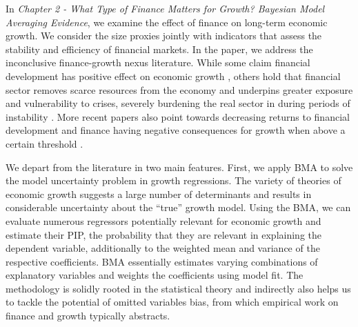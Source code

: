 \begin{refsection}
In \emph{Chapter 2 - What Type of Finance Matters for Growth? Bayesian Model Averaging Evidence}, we examine the effect of finance on long-term economic growth. We consider the size proxies jointly with indicators that assess the stability and efficiency of financial markets. In the paper, we address the inconclusive finance-growth nexus literature. While some claim financial development has positive effect on economic growth \parencite{AtjeJovanovich1993,KingLevine1993a,RajanZingales1998}, others hold that financial sector removes scarce resources from the economy \parencite{bolton2016cream,Tobin1984,axelson2015wall} and underpins greater exposure and vulnerability to crises, severely burdening the real sector in during periods of instability \parencite{Minsky1991,Stiglitz2000}. More recent papers also point towards decreasing returns to financial development and finance having negative consequences for growth when above a certain threshold \parencite{Arcandetal2012,LawSingh2014,RousseauWachtel2011}. 
 
We depart from the literature in two main features. First, we apply \ac{BMA} to solve the model uncertainty problem in growth regressions. The variety of theories of economic growth suggests a large number of determinants and results in considerable uncertainty about the ``true'' growth model. Using the \ac{BMA}, we can evaluate numerous regressors potentially relevant for economic growth and estimate their \ac{PIP}, the probability that they are relevant in explaining the dependent variable, additionally to the weighted mean and variance of the respective coefficients. \ac{BMA} essentially estimates varying combinations of explanatory variables and weights the coefficients using model fit. The methodology is solidly rooted in the statistical theory \parencite{Rafteryetal1997,Koopetal2007} and indirectly also helps us to tackle the potential of omitted variables bias, from which empirical work on finance and growth typically abstracts.


\end{refsection}
